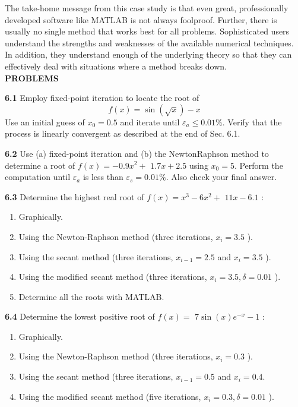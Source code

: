 \documentclass[../main.tex]{subfiles}
\begin{document}
The take-home message from this case study is that even great, professionally developed software like MATLAB is not always foolproof. Further, there is usually no single method that works best for all problems. Sophisticated users understand the strengths and weaknesses of the available numerical techniques. In addition, they understand enough of the underlying theory so that they can effectively deal with situations where a method breaks down.
\\

\noindent\textbf{PROBLEMS}

\begin{multicols}{2}
    \noindent \textbf{6.1} Employ fixed-point iteration to locate the root of
    $$
    f(x)=\sin (\sqrt{x})-x
    $$
    Use an initial guess of $x_{0}=0.5$ and iterate until $\varepsilon_{a} \leq 0.01 \%$. Verify that the process is linearly convergent as described at the end of Sec. 6.1.
    
    \noindent \textbf{6.2}  Use (a) fixed-point iteration and (b) the NewtonRaphson method to determine a root of $f(x)=-0.9 x^{2}+$ $1.7 x+2.5$ using $x_{0}=5$. Perform the computation until $\varepsilon_{a}$ is less than $\varepsilon_{s}=0.01 \%$. Also check your final answer.
   
    \noindent \textbf{6.3}  Determine the highest real root of $f(x)=x^{3}-6 x^{2}+$ $11 x-6.1$ :
    \begin{enumerate}[label=(\alph*)]
        \item Graphically.
        \item  Using the Newton-Raphson method (three iterations, $x_{i}=3.5$ ).
        \item  Using the secant method (three iterations, $x_{i-1}=2.5$ and $x_{i}=3.5$ ).
        \item  Using the modified secant method (three iterations, $x_{i}=3.5, \delta=0.01$ ).
        \item  Determine all the roots with MATLAB.
    \end{enumerate}
    
    \noindent \textbf{6.4}  Determine the lowest positive root of $f(x)=$ $7 \sin (x) e^{-x}-1$ :
    \begin{enumerate}[label=(\alph*)]
        \item  Graphically.
        \item  Using the Newton-Raphson method (three iterations, $x_{i}=0.3$ ).
        \item  Using the secant method (three iterations, $x_{i-1}=0.5$ and $x_{i}=0.4$.
        \item  Using the modified secant method (five iterations, $x_{i}=0.3, \delta=0.01$ ).
    \end{enumerate}
    

\end{multicols}
\end{document}
